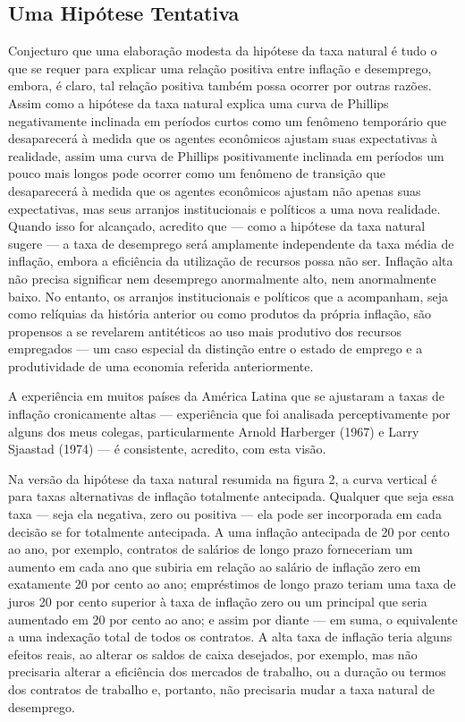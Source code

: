 \documentclass[12pt]{article}
\begin{document}
\subsection{Uma Hipótese Tentativa}

Conjecturo que uma elaboração modesta da hipótese da taxa natural é tudo o que se requer para explicar uma relação positiva entre inflação e desemprego, embora, é claro, tal relação positiva também possa ocorrer por outras razões. Assim como a hipótese da taxa natural explica uma curva de Phillips negativamente inclinada em períodos curtos como um fenômeno temporário que desaparecerá à medida que os agentes econômicos ajustam suas expectativas à realidade, assim uma curva de Phillips positivamente inclinada em períodos um pouco mais longos pode ocorrer como um fenômeno de transição que desaparecerá à medida que os agentes econômicos ajustam não apenas suas expectativas, mas seus arranjos institucionais e políticos a uma nova realidade. Quando isso for alcançado, acredito que — como a hipótese da taxa natural sugere — a taxa de desemprego será amplamente independente da taxa média de inflação, embora a eficiência da utilização de recursos possa não ser. Inflação alta não precisa significar nem desemprego anormalmente alto, nem anormalmente baixo. No entanto, os arranjos institucionais e políticos que a acompanham, seja como relíquias da história anterior ou como produtos da própria inflação, são propensos a se revelarem antitéticos ao uso mais produtivo dos recursos empregados — um caso especial da distinção entre o estado de emprego e a produtividade de uma economia referida anteriormente.

A experiência em muitos países da América Latina que se ajustaram a taxas de inflação cronicamente altas — experiência que foi analisada perceptivamente por alguns dos meus colegas, particularmente Arnold Harberger (1967) e Larry Sjaastad (1974) — é consistente, acredito, com esta visão.

Na versão da hipótese da taxa natural resumida na figura 2, a curva vertical é para taxas alternativas de inflação totalmente antecipada. Qualquer que seja essa taxa — seja ela negativa, zero ou positiva — ela pode ser incorporada em cada decisão se for totalmente antecipada. A uma inflação antecipada de 20 por cento ao ano, por exemplo, contratos de salários de longo prazo forneceriam um aumento em cada ano que subiria em relação ao salário de inflação zero em exatamente 20 por cento ao ano; empréstimos de longo prazo teriam uma taxa de juros 20 por cento superior à taxa de inflação zero ou um principal que seria aumentado em 20 por cento ao ano; e assim por diante — em suma, o equivalente a uma indexação total de todos os contratos. A alta taxa de inflação teria alguns efeitos reais, ao alterar os saldos de caixa desejados, por exemplo, mas não precisaria alterar a eficiência dos mercados de trabalho, ou a duração ou termos dos contratos de trabalho e, portanto, não precisaria mudar a taxa natural de desemprego.
\end{document}
